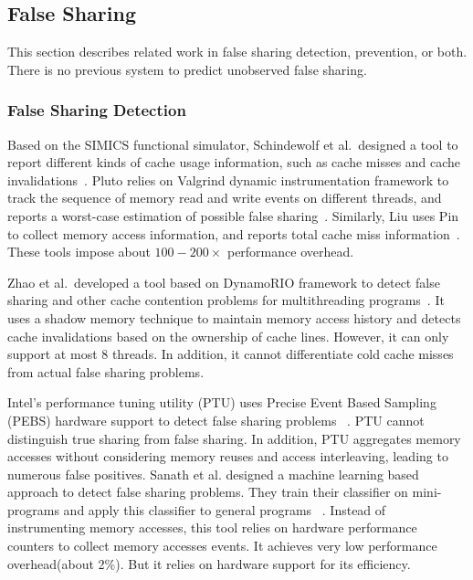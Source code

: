 
\label{sec:relatedwork}
\subsection{False Sharing}

This section describes related work in false sharing detection, prevention, or both. There is no previous
system to predict unobserved false sharing.

\subsubsection{False Sharing Detection}
Based on the SIMICS functional simulator, Schindewolf et al.\ designed a tool to report different kinds of cache usage information, such as cache misses and cache invalidations~\cite{falseshare:simulator}. Pluto relies on Valgrind dynamic instrumentation framework to track the sequence of memory read and write events on different threads, and reports a worst-case estimation of possible false sharing~\cite{falseshare:binaryinstrumentation1}.
Similarly, Liu uses Pin to collect memory access information, and reports total cache miss information~\cite{falseshare:binaryinstrumentation2}.
These tools impose about $100-200\times$ performance overhead.

Zhao et al.\ developed a tool based on DynamoRIO framework to detect false sharing and other cache contention problems
for multithreading programs~\cite{qinzhao}. 
It uses a shadow memory technique to maintain memory access history and detects cache invalidations based on the ownership of cache lines. However, it can only support at most $8$ threads. In addition, it cannot differentiate cold cache misses from actual false sharing problems.

Intel's performance tuning utility (PTU) uses Precise Event Based Sampling (PEBS) hardware support to detect false sharing problems ~\cite{detect:ptu, detect:intel}.  PTU cannot distinguish true sharing from false sharing. In addition, PTU aggregates memory accesses without considering memory reuses and access interleaving, leading to numerous false positives. Sanath et al. designed a machine learning based approach to detect false sharing problems. They train their classifier on mini-programs and apply this classifier to general programs ~\cite{mldetect}. Instead of instrumenting memory accesses, this tool relies on hardware performance counters to collect memory accesses events. It achieves very low performance overhead(about 2\%). But it relies on hardware support for its efficiency.  

